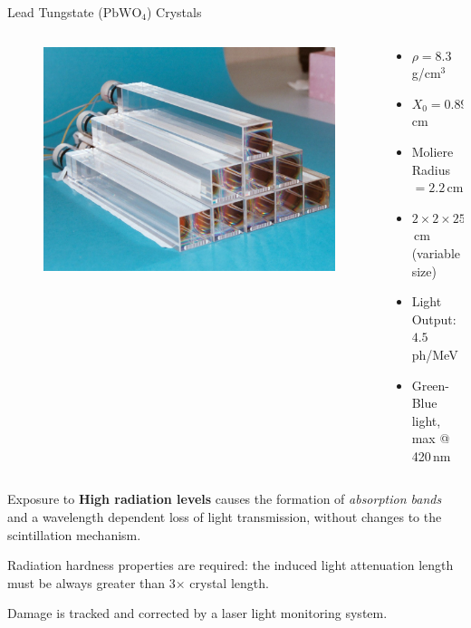 \documentclass[10pt]{beamer}
\begin{document}
\begin{frame}{Lead Tungstate ($\text{PbWO}_4$) Crystals}
    \small{
    \begin{columns}
        \begin{column}[]{0.4\textwidth}
            \begin{figure}
                \includegraphics[width=\textwidth]{./img/crystals.jpg}
            \end{figure}    
        \end{column}
        \begin{column}[]{0.5\textwidth}
            \smallskip
            \begin{itemize}
                \item $\rho = 8.3\,$g/cm$^3$
                \item $X_0 = 0.89\,$cm
                \item Moliere Radius $ = 2.2$\,cm
                \item $2\times2\times25$\,cm (variable size) 
                \item Light Output: $4.5$ ph/MeV
                \item Green-Blue light, max @ 420\,nm
            \end{itemize}
        \end{column}
    \end{columns}
    \bigskip
    
    Exposure to \textbf{High radiation levels} causes the formation of \emph{absorption bands} and a wavelength dependent loss of light transmission, without changes to the scintillation mechanism.
    
    Radiation hardness properties are required: the induced light attenuation length must be always greater than 3$\times$ crystal length. 
    
    Damage is tracked and corrected by a laser light monitoring system.
    }
\end{frame}
\end{document}

